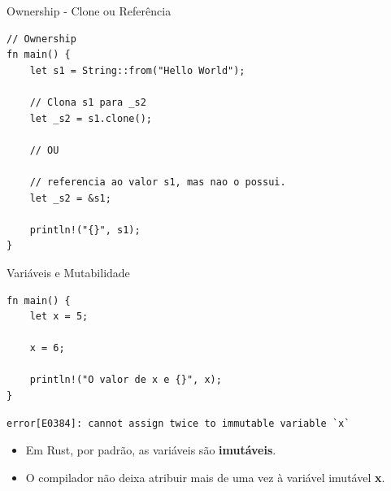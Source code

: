 \begin{frame}[fragile]{Ownership - Clone ou Referência}
\lstset{language=Rust, style=boxed}
\begin{lstlisting}
// Ownership
fn main() {
    let s1 = String::from("Hello World");

    // Clona s1 para _s2
    let _s2 = s1.clone();
    
    // OU
    
    // referencia ao valor s1, mas nao o possui.
    let _s2 = &s1; 

    println!("{}", s1);
}
\end{lstlisting}
\end{frame}

\begin{frame}[fragile]{Variáveis e Mutabilidade}
\lstset{language=Rust, style=boxed}
\begin{lstlisting}
fn main() {
    let x = 5;
    
    x = 6;

    println!("O valor de x e {}", x);
}
\end{lstlisting}
\begin{lstlisting}
error[E0384]: cannot assign twice to immutable variable `x`
\end{lstlisting}
\begin{itemize}
    \item Em Rust, por padrão, as variáveis são \textbf{imutáveis}.
    \item O compilador não deixa atribuir mais de uma vez à variável imutável \textbf{x}.
\end{itemize}
\end{frame}


